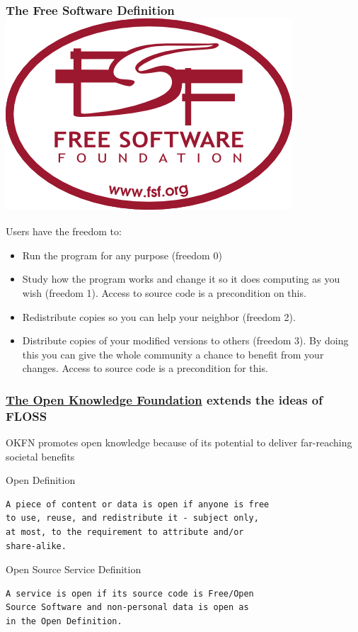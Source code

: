 \documentclass[hyperref={pdfpagelabels=false},xcolor=pst,pdf,fragile]{beamer}
\begin{document}
\begin{frame}
  \frametitle{The Free Software Definition \includegraphics[scale=0.09]{img/fsf.png}}

  Users have the freedom to:

  \begin{itemize}
	\item Run the program for any purpose (freedom 0)
	\pause
	\item Study how the program works and change it  so it does
	  computing as you wish (freedom 1). Access to source code is a
	  precondition on this.
	\pause
	\item Redistribute copies so you can help your neighbor (freedom 2).
	\pause
	\item Distribute copies of your modified versions to others (freedom
	  3). By doing this you can give the whole community a chance to
	  benefit from your changes. Access to source code is a precondition
	  for this.
  \end{itemize}

\end{frame}

\begin{frame}[fragile]
  \frametitle{
	  \href{http://okfn.org/}{The Open Knowledge Foundation}
  extends the ideas of FLOSS}

  OKFN promotes open knowledge because of its potential to deliver
  far-reaching societal benefits

  \pause
  \begin{block}{Open Definition} %
	  \begin{lstlisting}
A piece of content or data is open if anyone is free
to use, reuse, and redistribute it - subject only,
at most, to the requirement to attribute and/or
share-alike.

	  \end{lstlisting}
  \end{block}

  \pause
  \begin{block}{Open Source Service Definition}
	  \begin{lstlisting}
A service is open if its source code is Free/Open
Source Software and non-personal data is open as
in the Open Definition.

	  \end{lstlisting}
  \end{block}

\end{frame}
\end{document}
